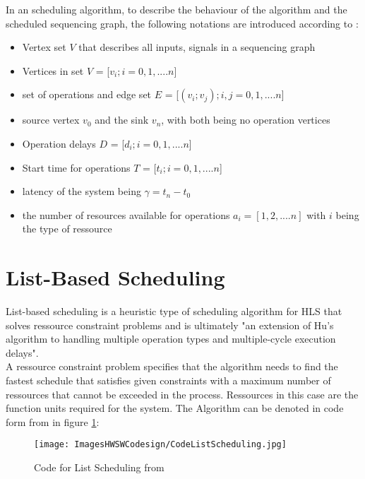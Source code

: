 \documentclass[conference]{IEEEtran}
\begin{document}
In an scheduling algorithm, to describe the behaviour of the algorithm and the scheduled sequencing graph, the following notations are introduced according to \cite{SynthesisAndOptimization}:
\begin{itemize}
    \item Vertex set $V$ that describes all inputs, signals in a sequencing graph
    \item Vertices in set $V$ = [$v_i; i=0,1,....n$]
    \item set of operations and edge set $E$ = [$(v_i;v_j); i,j = 0,1,....n$]
    \item source vertex $v_0$ and the sink $v_n$, with both being no operation vertices
    \item Operation delays $D$ = [$d_i; i = 0,1,....n$]
    \item Start time for operations $T$ = [$t_i; i = 0,1,....n$]
    \item latency of the system being $\gamma = t_n - t_0$
    \item the number of resources available for operations $a_i = [1,2,....n]$ with $i$ being the type of ressource
\end{itemize}

\section{List-Based Scheduling}
List-based scheduling is a  heuristic type of scheduling algorithm for HLS that solves ressource constraint problems and is ultimately "an extension of Hu's algorithm to handling multiple operation types and multiple-cycle execution delays"\cite{EfficientListBased}\cite{SynthesisAndOptimization}.\\

A ressource constraint problem specifies that the algorithm needs to find the fastest schedule that satisfies given constraints with a maximum number of ressources that cannot be exceeded in the process\cite{FormalApproach}. Ressources in this case are the function units required for the system\cite{FormalApproach}. The Algorithm can be denoted in code form from \cite{SynthesisAndOptimization} in figure \ref{fig:ListSchedulingCODE}:

\begin{figure}[htbp]
    \centering
    \texttt{[image: ImagesHWSWCodesign/CodeListScheduling.jpg]}
    \caption{Code for List Scheduling from \cite{SynthesisAndOptimization}}
    \label{fig:ListSchedulingCODE}
\end{figure}
\end{document}

